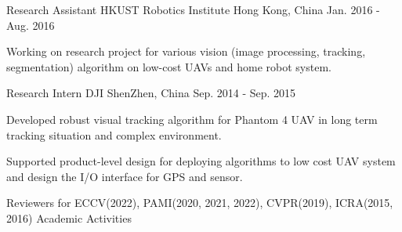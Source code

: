\begin{cventries}
  \cventry
    {Research Assistant} %
    {HKUST Robotics Institute} %
    {Hong Kong, China} %
    {Jan. 2016 - Aug. 2016} %
    {
      \begin{cvitems} %
        \item {Working on research project for various vision (image processing, tracking, segmentation) algorithm on low-cost UAVs and home robot system.}
      \end{cvitems}
    }

  \cventry
    {Research Intern} %
    {DJI} %
    {ShenZhen, China} %
    {Sep. 2014 - Sep. 2015} %
    {
      \begin{cvitems} %
        \item {Developed robust visual tracking algorithm for Phantom 4 UAV in long term tracking situation and complex environment.}
        \item {Supported product-level design for deploying algorithms to low cost UAV system and design the I/O interface for GPS and sensor.}
      \end{cvitems}
    }

	\cventry
	{Reviewers for ECCV(2022), PAMI(2020, 2021, 2022), CVPR(2019), ICRA(2015, 2016)} %
	{Academic Activities} %
	{} %
	{} %
	{
	}


\end{cventries}
